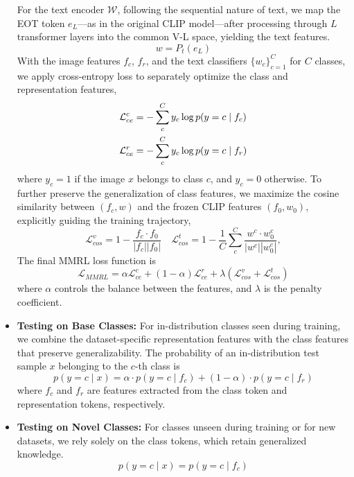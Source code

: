 \begin{itemize}
For the text encoder $\mathcal{W}$, following the sequential nature of text, we map the EOT token $e_L$—as in the original CLIP model—after processing through $L$ transformer layers into the common V-L space, yielding the text features.
\begin{equation} 
    w = P_{t}(e_{L}) \nonumber
\end{equation}
With the image features $f_c$, $f_r$, and the text classifiers $\{w_c\}_{c=1}^C$ for $C$ classes, we apply cross-entropy loss to separately optimize the class and representation features,
\begin{align}
\setlength\abovedisplayskip{3pt}
\setlength\belowdisplayskip{3pt}
    \mathcal{L}_{ce}^c &= -\sum_c^C y_c \log p(y = c \mid f_c) \nonumber \\
    \mathcal{L}_{ce}^r &= -\sum_c^C y_c \log p(y = c \mid f_r) \nonumber
\end{align}
where $y_c = 1$ if the image $x$ belongs to class $c$, and $y_c = 0$ otherwise. To further preserve the generalization of class features, we maximize the cosine similarity between $(f_c, w)$ and the frozen CLIP features $(f_0, w_0)$, explicitly guiding the training trajectory,
\begin{equation}
    \mathcal{L}_{cos}^v = 1 - \frac{f_c \cdot f_0}{|f_c| |f_0|} \quad \mathcal{L}_{cos}^t = 1 - \frac{1}{C}\sum_c^C \frac{w^c \cdot w_0^c}{|w^c| |w_0^c|}, \nonumber
\end{equation}
The final MMRL loss function is
\begin{equation}
    \mathcal{L}_{MMRL} = \alpha \mathcal{L}_{ce}^c + (1 - \alpha) \mathcal{L}_{ce}^r + \lambda (\mathcal{L}_{cos}^v + \mathcal{L}_{cos}^t)  \nonumber
\end{equation}
where $\alpha$ controls the balance between the features, and $\lambda$ is the penalty coefficient.

\item \textbf{Testing on Base Classes:} 
For in-distribution classes seen during training, we combine the dataset-specific representation features with the class features that preserve generalizability. The probability of an in-distribution test sample $x$ belonging to the $c$-th class is
\begin{equation}
    p(y = c \mid x) = \alpha \cdot p(y = c \mid f_c) + (1-\alpha) \cdot p(y = c \mid f_r) \nonumber
\end{equation}
where $f_c$ and $f_r$ are features extracted from the class token and representation tokens, respectively.

\item  \textbf{Testing on Novel Classes:}
For classes unseen during training or for new datasets, we rely solely on the class tokens, which retain generalized knowledge.
\begin{equation}
    p(y = c \mid x) = p(y = c \mid f_c) \nonumber
\end{equation}
\end{itemize}



